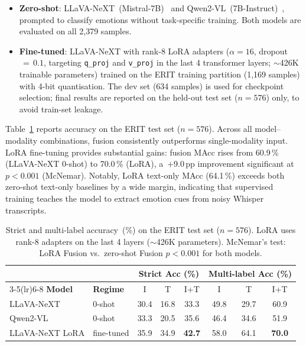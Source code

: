 \begin{itemize}[nosep]
  \item \textbf{Zero-shot}: LLaVA-NeXT~(Mistral-7B)~\cite{liu2024llavanext}
        and Qwen2-VL~(7B-Instruct)~\cite{wang2024qwen2vl}, prompted to
        classify emotions without task-specific training.  Both models are
        evaluated on all 2{,}379 samples.
  \item \textbf{Fine-tuned}: LLaVA-NeXT with rank-8 LoRA adapters
        ($\alpha\!=\!16$, dropout$\,=\,0.1$, targeting \texttt{q\_proj} and
        \texttt{v\_proj} in the last 4 transformer layers;
        ${\sim}$426K trainable parameters) trained on the ERIT training
        partition (1{,}169 samples) with 4-bit quantisation.  The dev set
        (634 samples) is used for checkpoint selection; final results are
        reported on the held-out test set ($n\!=\!576$) only, to avoid
        train-set leakage.
\end{itemize}

Table~\ref{tab:erit-all} reports accuracy on the ERIT test set
($n=576$).  Across all model--modality combinations, fusion consistently
outperforms single-modality input.  LoRA fine-tuning provides substantial
gains: fusion MAcc rises from 60.9\,\% (LLaVA-NeXT 0-shot) to 70.0\,\%
(LoRA), a~+9.0\,pp improvement significant at $p < 0.001$ (McNemar).
Notably, LoRA text-only MAcc (64.1\,\%) exceeds both zero-shot
text-only baselines by a wide margin, indicating that supervised training
teaches the model to extract emotion cues from noisy Whisper transcripts.

\begin{table}[t]
\centering
\caption{Strict and multi-label accuracy~(\%) on the ERIT test set
($n{=}576$).  LoRA uses rank-8 adapters on the last 4 layers
(${\sim}$426K parameters).  McNemar's test: LoRA Fusion vs.\
zero-shot Fusion $p < 0.001$ for both models.}
\label{tab:erit-all}
\begin{tabular}{@{}llcccccc@{}}
\toprule
 & & \multicolumn{3}{c}{\textbf{Strict Acc (\%)}}
   & \multicolumn{3}{c}{\textbf{Multi-label Acc (\%)}} \\
\cmidrule(lr){3-5}\cmidrule(lr){6-8}
\textbf{Model} & \textbf{Regime} & I & T & I+T & I & T & I+T \\
\midrule
LLaVA-NeXT      & 0-shot & 30.4 & 16.8 & 33.3
                         & 49.8 & 29.7 & 60.9 \\
Qwen2-VL        & 0-shot & 33.3 & 20.5 & 35.6
                         & 46.4 & 34.6 & 51.9 \\
\midrule
LLaVA-NeXT LoRA & fine-tuned & 35.9 & 34.9 & \textbf{42.7}
                              & 58.0 & 64.1 & \textbf{70.0} \\
\bottomrule
\end{tabular}
\end{table}


